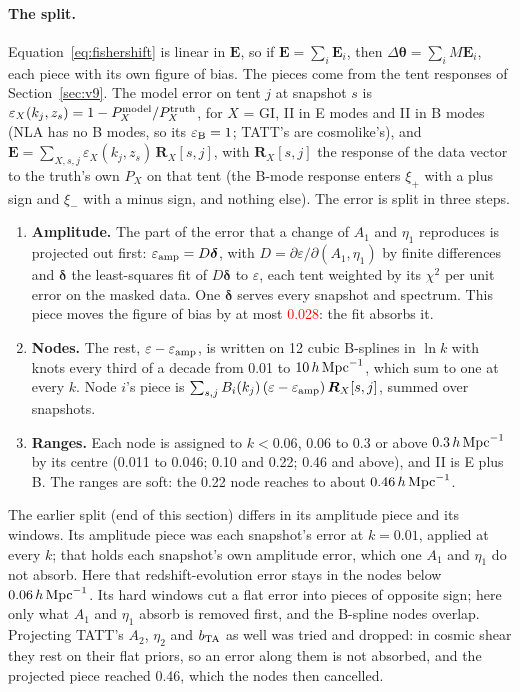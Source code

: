 \documentclass[11pt]{article}
\newcommand{\hMpc}{\,h\,{\rm Mpc}^{-1}}
\newcommand{\bvec}[1]{\boldsymbol{#1}}
\newif\ifnumbersfinal
\newcommand{\refresh}[1]{\ifnumbersfinal#1\else\textcolor{red}{#1}\fi}
\newcommand{\CPamp}{\refresh{0.028}}
\begin{document}
\paragraph{The split.}
Equation~\eqref{eq:fishershift} is linear in $\bvec E$, so if $\bvec E =
\sum_i \bvec E_i$, then $\Delta\bvec\theta = \sum_i M\bvec E_i$, each piece
with its own figure of bias. The pieces come from the tent responses of
Section~\ref{sec:v9}. The model error on tent $j$ at snapshot $s$ is
$\varepsilon_X(k_j, z_s) = 1 - P_X^{\rm model}/P_X^{\rm truth}$, for $X$ =
GI, II in E modes and II in B modes (NLA has no B modes, so its
$\varepsilon_{\rm B} = 1$; TATT's are cosmolike's), and
$\bvec E = \sum_{X,s,j} \varepsilon_X(k_j, z_s)\,\bvec R_X[s, j]$, with
$\bvec R_X[s,j]$ the response of the data vector to the truth's own $P_X$ on
that tent (the B-mode response enters $\xi_+$ with a plus sign and $\xi_-$
with a minus sign, and nothing else). The error is split in three steps.
\begin{enumerate}
  \item \textbf{Amplitude.} The part of the error that a change of $A_1$
    and $\eta_1$ reproduces is projected out first:
    $\varepsilon_{\rm amp} = D\bvec\delta$, with $D =
    \partial\varepsilon/\partial(A_1, \eta_1)$ by finite differences and
    $\bvec\delta$ the least-squares fit of $D\bvec\delta$ to $\varepsilon$,
    each tent weighted by its $\chi^2$ per unit error on the masked data.
    One $\bvec\delta$ serves every snapshot and spectrum. This piece moves
    the figure of bias by at most \CPamp: the fit absorbs it.
  \item \textbf{Nodes.} The rest, $\varepsilon - \varepsilon_{\rm amp}$, is
    written on 12 cubic B-splines in $\ln k$ with knots every third of a
    decade from 0.01 to $10\hMpc$, which sum to one at every $k$. Node $i$'s
    piece is $\sum_{s,j} B_i(k_j)\,(\varepsilon - \varepsilon_{\rm
    amp})\,\bvec R_X[s, j]$, summed over snapshots.
  \item \textbf{Ranges.} Each node is assigned to $k < 0.06$, 0.06 to 0.3
    or above $0.3\hMpc$ by its centre (0.011 to 0.046; 0.10 and 0.22; 0.46
    and above), and II is E plus B. The ranges are soft: the 0.22 node
    reaches to about $0.46\hMpc$.
\end{enumerate}
The earlier split (end of this section) differs in its amplitude piece and
its windows. Its amplitude piece was each snapshot's error at $k = 0.01$,
applied at every $k$; that holds each snapshot's own amplitude error, which
one $A_1$ and $\eta_1$ do not absorb. Here that redshift-evolution error
stays in the nodes below $0.06\hMpc$. Its hard windows cut a flat error into
pieces of opposite sign; here only what $A_1$ and $\eta_1$ absorb is
removed first, and the B-spline nodes overlap. Projecting TATT's $A_2$,
$\eta_2$ and $b_{\rm TA}$ as well was tried and dropped: in cosmic shear
they rest on their flat priors, so an error along them is not absorbed, and
the projected piece reached 0.46, which the nodes then cancelled.
\end{document}
